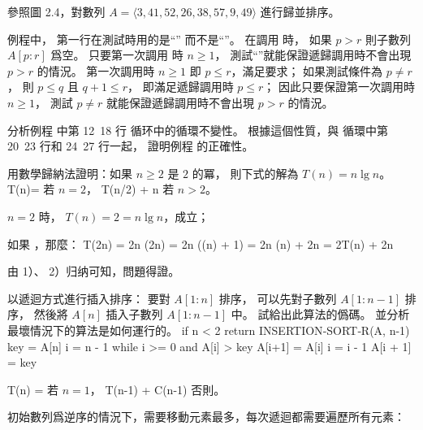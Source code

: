 \startsection[
  title={Designing algorithms},
]

\startEXERCISE
參照圖 2.4，對數列 $A=\langle 3,41,52,26,38,57,9,49\rangle$ 進行歸並排序。
\stopEXERCISE
\startANSWER
\externalfigure[output/e2_3_1-1]
\stopANSWER

\startEXERCISE
{} 例程中，
第一行在測試時用的是“” 而不是“”。
在調用  時，
如果 $p>r$ 則子數列 $A[p:r]$ 爲空。
只要第一次調用  時 $n\ge 1$，
測試“”就能保證遞歸調用時不會出現 $p>r$ 的情況。
\stopEXERCISE
\startANSWER
第一次調用時 $n\ge 1$ 即 $p\le r$，滿足要求；
如果測試條件為 $p\ne r$，
則 $p\le q$ 且 $q+1\le r$，
即滿足遞歸調用時 $p\le r$；
因此只要保證第一次調用時 $n\ge 1$，
測試 $p\ne r$ 就能保證遞歸調用時不會出現 $p>r$ 的情況。
\stopANSWER

\startEXERCISE
分析例程  中第 12~18 行  循环中的循環不變性。
根據這個性質，與  循環中第 20~23 行和 24~27 行一起，
證明例程  的正確性。
\stopEXERCISE
\startANSWER
{}
\stopANSWER

\startEXERCISE
用數學歸納法證明：如果 $n\ge 2$ 是 $2$ 的冪，
則下式的解為 $T(n)=n\lg n$。
\startformula
T(n)=\startmathcases
{} \NC 若 $n=2$，\NR
{} T(n/2) + n \NC 若 $n>2$。 \NR
\stopmathcases
\stopformula
\stopEXERCISE

\startANSWER
\startigBase[n]
\item $n=2$ 時， $T(n)=2=n\lg n$，成立；
\item 如果 ，那麼：
\startformula\startalign
\NC T(2n) \NC = 2n \lg(2n) \NR
\NC       \NC = 2n (\lg(n) + 1) \NR
\NC	      \NC = 2n \lg(n) + 2n \NR
\NC	      \NC = 2T(n) + 2n \NR
\stopalign\stopformula
\item 由 1）、 2）归纳可知，問題得證。
\stopigBase
\stopANSWER

\startEXERCISE
以遞迴方式進行插入排序：
要對 $A[1:n]$ 排序，
可以先對子數列 $A[1:n-1]$ 排序，
然後將 $A[n]$ 插入子數列 $A[1:n-1]$ 中。
試給出此算法的僞碼。
並分析最壞情況下的算法是如何運行的。
\stopEXERCISE
\startANSWER
{}
\startCLRSCODE
if n < 2
	return
INSERTION‐SORT‐R(A, n-1)
key = A[n]
i = n - 1
while i >= 0 and A[i] > key
	A[i+1] = A[i]
	i = i - 1
A[i + 1] = key
\stopCLRSCODE

\startformula
T(n) = \startmathcases
{} \NC 若 $n = 1$， \NR
\NC T(n-1) + C(n-1)	\NC 否則。 \NR
\stopmathcases
\stopformula

初始數列爲逆序的情況下，需要移動元素最多，每次遞迴都需要遍歷所有元素：

